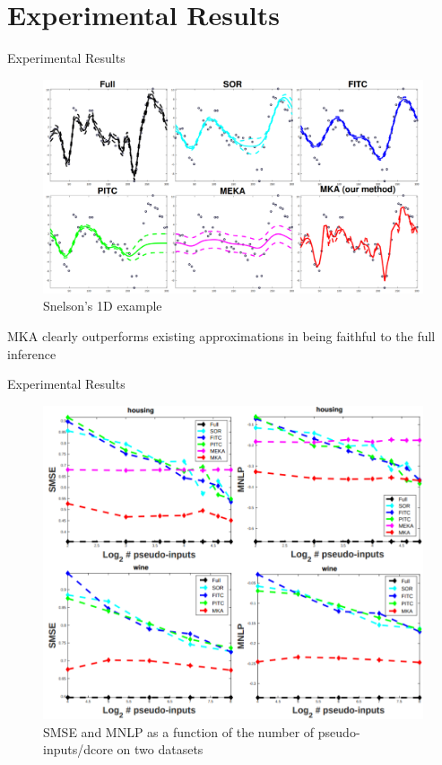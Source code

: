 \documentclass{beamer}
\begin{document}
\section{Experimental Results}

\begin{frame}{Experimental Results}
    \begin{figure}
        \centering
        \includegraphics[width=0.8\linewidth]{figs/toyexample.png}
        \caption{Snelson's 1D example}
    \end{figure}
    MKA clearly outperforms existing approximations in being faithful to the full inference
\end{frame}

\begin{frame}{Experimental Results}
    \begin{figure}
        \centering
        \includegraphics[width=0.6\linewidth]{figs/realdata.png}
        \caption{SMSE and MNLP as a function of the number of pseudo-inputs/dcore on two datasets}
    \end{figure}
\end{frame}
\end{document}
